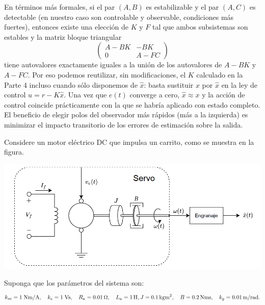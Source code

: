 \documentclass[
  11pt,
  letterpaper,
   addpoints,
   answers
  ]{exam}
\begin{document}
\begin{questions}
\begin{solution}
  En términos más formales, si el par $(A,B)$ es estabilizable y el par $(A,C)$ es detectable (en nuestro caso son controlable y observable, condiciones más fuertes), entonces existe una elección de $K$ y $F$ tal que ambos subsistemas son estables y la matriz bloque triangular
  \[
     \begin{pmatrix} A-BK & -BK \\ 0 & A-FC \end{pmatrix}
  \]
  tiene autovalores exactamente iguales a la unión de los autovalores de $A-BK$ y $A-FC$. Por eso podemos reutilizar, sin modificaciones, el $K$ calculado en la Parte 4 incluso cuando sólo disponemos de $\hat x$: basta sustituir $x$ por $\hat x$ en la ley de control $u = r - K\hat x$. Una vez que $e(t)$ converge a cero, $\hat x \approx x$ y la acción de control coincide prácticamente con la que se habría aplicado con estado completo. El beneficio de elegir polos del observador más rápidos (más a la izquierda) es minimizar el impacto transitorio de los errores de estimación sobre la salida.
  \end{solution}
  \question Considere un motor eléctrico DC que impulsa un carrito, como se muestra en la figura.
  \begin{center}
    \includegraphics[width=.75\textwidth]{../figures/Auxiliar_4_4.png}
  \end{center}
  Suponga que los parámetros del sistema son:
  \[
     k_m = 1\;\text{Nm/A},\quad k_e = 1\;\text{Vs},\quad R_a = 0.01\,\Omega,\quad L_a = 1\,\text{H},        \\
     J = 0.1\,\text{kgm}^2,\quad B = 0.2\,\text{Nms}, \quad k_g = 0.01\,\text{m/rad}.
  \]
\end{questions}
\end{document}
